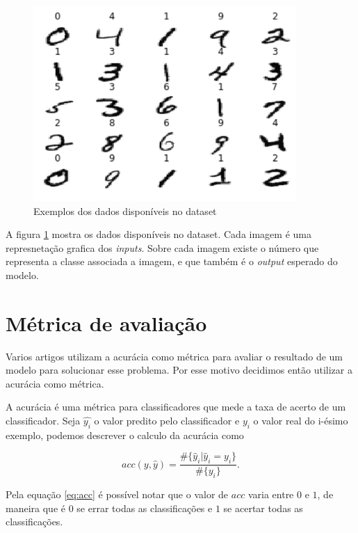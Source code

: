 \documentclass[a4paper,10pt]{article}
\begin{document}
\newpage

\begin{figure}[h]
        \centering
        \includegraphics[width=10cm]{dataset_example.png}
        \caption{Exemplos dos dados disponíveis no dataset}
        \label{fig:exemploDataset}
\end{figure}

A figura \ref{fig:exemploDataset} mostra os dados disponíveis no dataset. Cada imagem é uma represnetação grafica dos \textit{inputs}. Sobre cada imagem existe o número que representa a classe associada a imagem, e que também é o \textit{output} esperado do modelo.

\section{Métrica de avaliação}

Varios artigos \cite{FredAgarap2017, Mahmoud2014, Sharma2015, Saavedra2014} utilizam a acurácia como métrica para avaliar o resultado de um modelo para solucionar esse problema. Por esse motivo decidimos então utilizar a acurácia como métrica.

A acurácia é uma métrica para classificadores que mede a taxa de acerto de um classificador. Seja $\hat{y_i}$ o valor predito pelo classificador e $y_i$ o valor real do i-ésimo exemplo, podemos descrever o calculo da acurácia como 

\begin{equation} \label{eq:acc}
 acc(y,\hat{y}) = \frac{\#\{\hat{y}_i | \hat{y}_i = y_i\}}{\#\{y_i\}}.
 \end{equation}

Pela equação \ref{eq:acc} é possível notar que o valor de $acc$ varia entre $0$ e $1$, de maneira que é $0$ se errar todas as classificações e $1$ se acertar todas as classificações. 
\end{document}
